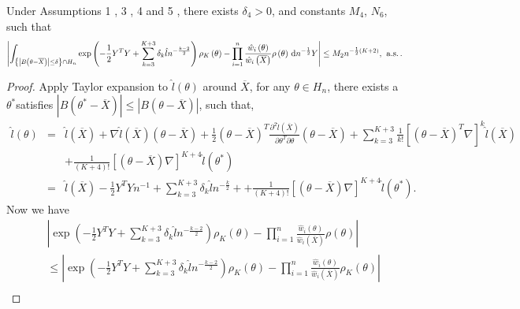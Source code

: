 \begin{lemma}
\label{lem:central-expansion-post-prod-2}%
 Under  Assumptions 1 , 3 , 4 and 5 ,  there exists  $\delta_{4}>0$, and constants
$M_{4}$, $N_{6}$, such that 
\begin{equation}
\left|\int_{\left\{ \left|B\left(\theta-\overline{X}\right)\right|\le\delta\right\} \cap H_{n}}\exp\left(-\frac{1}{2}Y^{T}Y+\sum_{k=3}^{K+3}\delta_{k}\hat{l}n^{-\frac{k-2}{2}}\right)\rho_{K}\left(\theta\right)-\prod_{i=1}^{n}\frac{\hat{w}_{i}\left(\theta\right)}{\hat{w}_{i}\left(\overline{X}\right)}\rho\left(\theta\right)\,\mathrm{d} n^{-\frac{1}{2}}Y\right|\le M_{2}n^{-\frac{1}{2}\left(K+2\right)},\:\,\mathrm{a.s.}\,.\label{eq:central-exp-post-2}
\end{equation}
\end{lemma}
\begin{proof}
Apply Taylor expansion to $\hat{l}\left(\theta\right)$ around $\overline{X}$,
for any $\theta\in H_{n}$, there exists a $\theta^{*}$satisfies
$\left|B\left(\theta^{*}-\overline{X}\right)\right|\le\left|B\left(\theta-\overline{X}\right)\right|$,
such that, 
\begin{eqnarray*}
\hat{l}\left(\theta\right) & = & \hat{l}\left(\overline{X}\right)+\nabla\hat{l}\left(\overline{X}\right)\left(\theta-\overline{X}\right)+\frac{1}{2}\left(\theta-\overline{X}\right)^{T}\frac{\partial^{2}\hat{l}\left(\overline{X}\right)}{\partial\theta^{T}\partial\theta}\left(\theta-\overline{X}\right)+\sum_{k=3}^{K+3}\frac{1}{k!}\left[\left(\theta-\overline{X}\right)^{T}\nabla\right]^{k}\hat{l}\left(\overline{X}\right)\\
 &  & +\frac{1}{\left(K+4\right)!}\left[\left(\theta-\overline{X}\right)\nabla\right]^{K+4}\hat{l}\left(\theta^{*}\right)\\
 & = & \hat{l}\left(\overline{X}\right)-\frac{1}{2}Y^{T}Yn^{-1}+\sum_{k=3}^{K+3}\delta_{k}\hat{l}n^{-\frac{k}{2}}++\frac{1}{\left(K+4\right)!}\left[\left(\theta-\overline{X}\right)\nabla\right]^{K+4}\hat{l}\left(\theta^{*}\right).
\end{eqnarray*}
Now we have 
\begin{eqnarray*}
 &  & \left|\exp\left(-\frac{1}{2}Y^{T}Y+\sum_{k=3}^{K+3}\delta_{k}\hat{l}n^{-\frac{k-2}{2}}\right)\rho_{K}\left(\theta\right)-\prod_{i=1}^{n}\frac{\hat{w}_{i}\left(\theta\right)}{\hat{w}_{i}\left(\overline{X}\right)}\rho\left(\theta\right)\right|\\
 &  & \le\left|\exp\left(-\frac{1}{2}Y^{T}Y+\sum_{k=3}^{K+3}\delta_{k}\hat{l}n^{-\frac{k-2}{2}}\right)\rho_{K}\left(\theta\right)-\prod_{i=1}^{n}\frac{\hat{w}_{i}\left(\theta\right)}{\hat{w}_{i}\left(\overline{X}\right)}\rho_{K}\left(\theta\right)\right|\\

\end{eqnarray*}
\end{proof}
